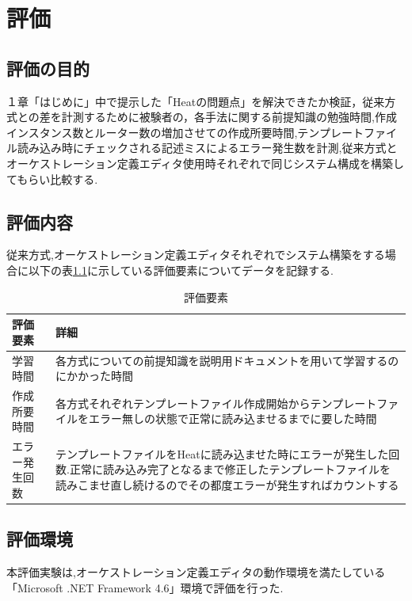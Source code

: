 \documentclass[mingoth]{kut-paper}		%
\begin{document}
\chapter{評価}
	\section{評価の目的}
	１章「はじめに」中で提示した「Heatの問題点」を解決できたか検証，従来方式との差を計測するために被験者の，各手法に関する前提知識の勉強時間,作成インスタンス数とルーター数の増加させての作成所要時間,テンプレートファイル読み込み時にチェックされる記述ミスによるエラー発生数を計測,従来方式とオーケストレーション定義エディタ使用時それぞれで同じシステム構成を構築してもらい比較する.
	\section{評価内容}
	従来方式,オーケストレーション定義エディタそれぞれでシステム構築をする場合に以下の表\ref{table:5}に示している評価要素についてデータを記録する.
	\begin{table}[H]
		\begin{center}
			\caption{評価要素}
			\label{table:5}
			\begin{tabular}{|p{5cm}|p{7cm}|}\hline
				評価要素 & 詳細\\ \hline \hline
				学習時間 & 各方式についての前提知識を説明用ドキュメントを用いて学習するのにかかった時間\\ \hline
				作成所要時間 & 各方式それぞれテンプレートファイル作成開始からテンプレートファイルをエラー無しの状態で正常に読み込ませるまでに要した時間\\ \hline
				エラー発生回数 & テンプレートファイルをHeatに読み込ませた時にエラーが発生した回数.正常に読み込み完了となるまで修正したテンプレートファイルを読みこませ直し続けるのでその都度エラーが発生すればカウントする\\ \hline
			\end{tabular}
		\end{center}
	\end{table}
	\section{評価環境}
	本評価実験は,オーケストレーション定義エディタの動作環境を満たしている「Microsoft .NET Framework 4.6」環境で評価を行った.
	
\end{document}
